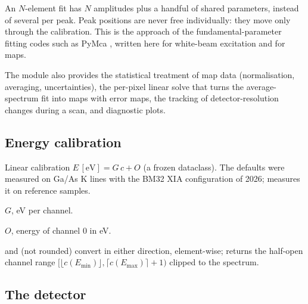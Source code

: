 An $N$-element fit has $N$ amplitudes plus a handful of shared parameters, instead of several
per peak. Peak positions are never free individually: they move only through the
calibration. This is the approach of the fundamental-parameter fitting codes such as PyMca
\citep{Sole2007}, written here for white-beam excitation and for maps.

The module also provides the statistical treatment of map data (normalisation, averaging,
uncertainties), the per-pixel linear solve that turns the average-spectrum fit into maps with
error maps, the tracking of detector-resolution changes during a scan, and diagnostic plots.


\subsection{Energy calibration}

Linear calibration $E\,[\mathrm{eV}] = G\,c + O$ (a frozen dataclass). The defaults were
measured on Ga/As K lines with the BM32 XIA configuration of 2026; 
measures it on reference samples.
\begin{args}
\item[gain] $G$, eV per channel.
\item[offset] $O$, energy of channel 0 in eV.
\end{args}
  and  (not rounded) convert in
either direction, element-wise;  returns the
half-open channel range $[\lfloor c(E_\mathrm{min})\rfloor, \lceil c(E_\mathrm{max})\rceil+1)$
clipped to the spectrum.

\subsection{The detector}\label{sec:detector}


